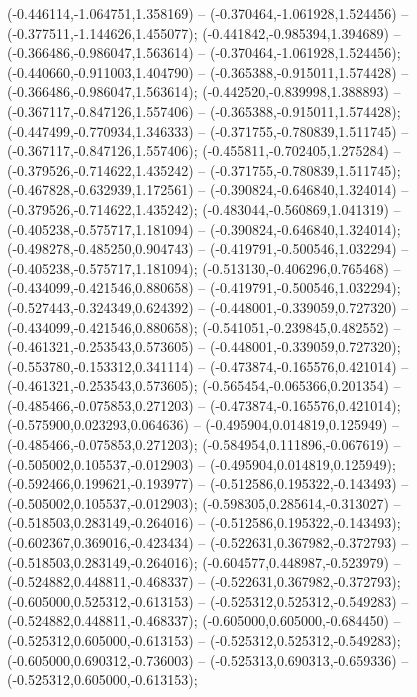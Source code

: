  (-0.446114,-1.064751,1.358169) -- (-0.370464,-1.061928,1.524456) -- (-0.377511,-1.144626,1.455077);
 (-0.441842,-0.985394,1.394689) -- (-0.366486,-0.986047,1.563614) -- (-0.370464,-1.061928,1.524456);
 (-0.440660,-0.911003,1.404790) -- (-0.365388,-0.915011,1.574428) -- (-0.366486,-0.986047,1.563614);
 (-0.442520,-0.839998,1.388893) -- (-0.367117,-0.847126,1.557406) -- (-0.365388,-0.915011,1.574428);
 (-0.447499,-0.770934,1.346333) -- (-0.371755,-0.780839,1.511745) -- (-0.367117,-0.847126,1.557406);
 (-0.455811,-0.702405,1.275284) -- (-0.379526,-0.714622,1.435242) -- (-0.371755,-0.780839,1.511745);
 (-0.467828,-0.632939,1.172561) -- (-0.390824,-0.646840,1.324014) -- (-0.379526,-0.714622,1.435242);
 (-0.483044,-0.560869,1.041319) -- (-0.405238,-0.575717,1.181094) -- (-0.390824,-0.646840,1.324014);
 (-0.498278,-0.485250,0.904743) -- (-0.419791,-0.500546,1.032294) -- (-0.405238,-0.575717,1.181094);
 (-0.513130,-0.406296,0.765468) -- (-0.434099,-0.421546,0.880658) -- (-0.419791,-0.500546,1.032294);
 (-0.527443,-0.324349,0.624392) -- (-0.448001,-0.339059,0.727320) -- (-0.434099,-0.421546,0.880658);
 (-0.541051,-0.239845,0.482552) -- (-0.461321,-0.253543,0.573605) -- (-0.448001,-0.339059,0.727320);
 (-0.553780,-0.153312,0.341114) -- (-0.473874,-0.165576,0.421014) -- (-0.461321,-0.253543,0.573605);
 (-0.565454,-0.065366,0.201354) -- (-0.485466,-0.075853,0.271203) -- (-0.473874,-0.165576,0.421014);
 (-0.575900,0.023293,0.064636) -- (-0.495904,0.014819,0.125949) -- (-0.485466,-0.075853,0.271203);
 (-0.584954,0.111896,-0.067619) -- (-0.505002,0.105537,-0.012903) -- (-0.495904,0.014819,0.125949);
 (-0.592466,0.199621,-0.193977) -- (-0.512586,0.195322,-0.143493) -- (-0.505002,0.105537,-0.012903);
 (-0.598305,0.285614,-0.313027) -- (-0.518503,0.283149,-0.264016) -- (-0.512586,0.195322,-0.143493);
 (-0.602367,0.369016,-0.423434) -- (-0.522631,0.367982,-0.372793) -- (-0.518503,0.283149,-0.264016);
 (-0.604577,0.448987,-0.523979) -- (-0.524882,0.448811,-0.468337) -- (-0.522631,0.367982,-0.372793);
 (-0.605000,0.525312,-0.613153) -- (-0.525312,0.525312,-0.549283) -- (-0.524882,0.448811,-0.468337);
 (-0.605000,0.605000,-0.684450) -- (-0.525312,0.605000,-0.613153) -- (-0.525312,0.525312,-0.549283);
 (-0.605000,0.690312,-0.736003) -- (-0.525313,0.690313,-0.659336) -- (-0.525312,0.605000,-0.613153);
